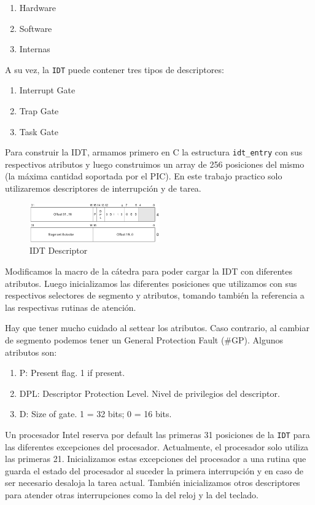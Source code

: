 \begin{enumerate}
\item Hardware
\item Software
\item Internas
\end{enumerate}

A su vez, la \texttt{IDT} puede contener tres tipos de descriptores:

\begin{enumerate}
\item Interrupt Gate
\item Trap Gate
\item Task Gate
\end{enumerate}

Para construir la IDT, armamos primero en C la estructura \texttt{idt\_entry} con sus respectivos atributos y luego construimos un array de 256 posiciones del mismo (la máxima cantidad soportada por el PIC). En este trabajo practico solo utilizaremos descriptores de interrupción y de tarea.

\begin{figure}[h!]
  \centering
    \includegraphics[width=0.5\textwidth]{images/idt_desc}
  \caption{IDT Descriptor}
\end{figure}

Modificamos la macro de la cátedra para poder cargar la IDT con diferentes atributos. Luego inicializamos las diferentes posiciones que utilizamos con sus respectivos selectores de segmento y atributos, tomando también la referencia a las respectivas rutinas de atención.

Hay que tener mucho cuidado al settear los atributos. Caso contrario, al cambiar de segmento podemos tener un General Protection Fault (\#GP). Algunos atributos son:

\begin{enumerate}
\item P: Present flag. 1 if present.
\item DPL: Descriptor Protection Level. Nivel de privilegios del descriptor.
\item D: Size of gate. 1 = 32 bits; 0 = 16 bits.
\end{enumerate}

Un procesador Intel reserva por default las primeras 31 posiciones de la \texttt{IDT} para las diferentes excepciones del procesador. Actualmente, el procesador solo utiliza las primeras 21. Inicializamos estas excepciones del procesador a una rutina que guarda el estado del procesador al suceder la primera interrupción y en caso de ser necesario desaloja la tarea actual. También inicializamos otros descriptores para atender otras interrupciones como la del reloj y la del teclado.

